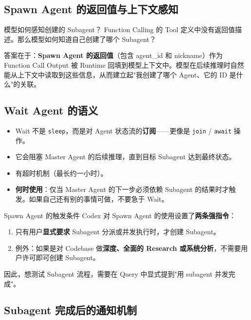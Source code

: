 \documentclass[a4paper]{article}
\begin{document}
\subsection{Spawn Agent 的返回值与上下文感知}

\begin{knowledgebox}{模型如何感知创建的 Subagent？}
Function Calling 的 Tool 定义中没有返回值描述。那么模型如何知道自己创建了哪个 Subagent？

答案在于：\textbf{Spawn Agent 的返回值}（包含 agent\_id 和 nickname）作为 Function Call Output 被 Runtime 回填到模型上下文中。模型在后续推理时自然能从上下文中读取到这些信息，从而建立起"我创建了哪个 Agent、它的 ID 是什么"的关联。
\end{knowledgebox}

\subsection{Wait Agent 的语义}

\begin{itemize}
    \item Wait 不是 \texttt{sleep}，而是对 Agent 状态流的\textbf{订阅}——更像是 \texttt{join} / \texttt{await} 操作。
    \item 它会阻塞 Master Agent 的后续推理，直到目标 Subagent 达到最终状态。
    \item 有超时机制（最长约一小时）。
    \item \textbf{何时使用}：仅当 Master Agent 的下一步必须依赖 Subagent 的结果时才触发。如果自己还有别的事情可做，不要急于 Wait。
\end{itemize}

\begin{importantbox}{Spawn Agent 的触发条件}
Codex 对 Spawn Agent 的使用设置了\textbf{两条强指令}：
\begin{enumerate}
    \item 只有用户\textbf{显式要求} Subagent 分派或并发执行时，才创建 Subagent。
    \item 例外：如果是对 Codebase 做\textbf{深度、全面的 Research 或系统分析}，不需要用户许可即可创建 Subagent。
\end{enumerate}
因此，想测试 Subagent 流程，需要在 Query 中显式提到"用 subagent 并发完成"。
\end{importantbox}

\subsection{Subagent 完成后的通知机制}
\end{document}
